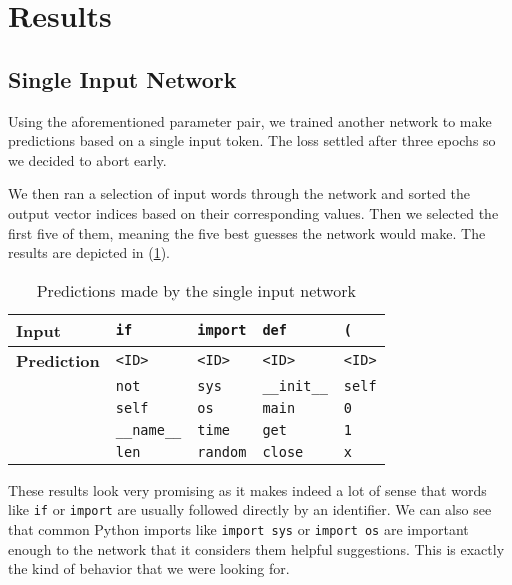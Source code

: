 \section{Results}
\label{sec:results}

  \subsection{Single Input Network}
  \label{sub:single_input_network}
  
    Using the aforementioned parameter pair, we trained another network to make predictions based on
    a single input token. The loss settled after three epochs so we decided to abort early.

    We then ran a selection of input words through the network and sorted the output vector indices
    based on their corresponding values. Then we selected the first five of them, meaning the five
    best guesses the network would make. The results are depicted in (\ref{tab:singleres}).
    
    \begin{table}[htpb]
      \centering
      \label{tab:singleres}
      \begin{tabular}{l | l | l | l | l}
        \textbf{Input} & \verb+if+ & \verb+import+ & \verb+def+ & \verb+(+ \\ \hline  
        \textbf{Prediction}  &  \verb+<ID>+ &\verb+<ID>+  & \verb+<ID>+ & \verb+<ID>+ \\
          & \verb+not+ & \verb+sys+ & \verb+__init__+ & \verb+self+ \\
          & \verb+self+ & \verb+os+ & \verb+main+ & \verb+0+ \\
          & \verb+__name__+ & \verb+time+ & \verb+get+ & \verb+1+ \\
          & \verb+len+ & \verb+random+ & \verb+close+ & \verb+x+ \\
      \end{tabular}
      \caption{Predictions made by the single input network}
    \end{table}

    These results look very promising as it makes indeed a lot of sense that words like
    \verb+if+ or \verb+import+ are usually followed directly by an identifier. We can also
    see that common Python imports like \verb+import sys+ or \verb+import os+ are important
    enough to the network that it considers them helpful suggestions. This is exactly
    the kind of behavior that we were looking for.


